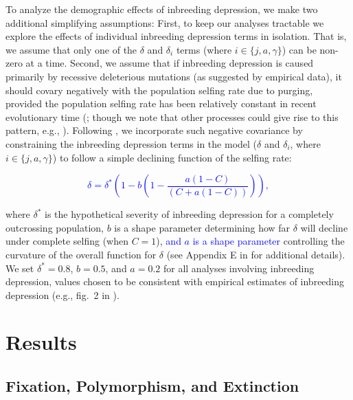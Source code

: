 \documentclass[11pt]{article}
\begin{document}
To analyze the demographic effects of inbreeding depression, we make two additional simplifying assumptions: First, to keep our analyses tractable we explore the effects of individual inbreeding depression terms in isolation. That is, we assume that only one of the $\delta$ and $\delta_i$ terms (where $i \in \{j,a,\gamma\}$) can be non-zero at a time. Second, we assume that if inbreeding depression is caused primarily by recessive deleterious mutations (as suggested by empirical data), it should covary negatively with the population selfing rate due to purging, provided the population selfing rate has been relatively constant in recent evolutionary time (\citealt{Charlesworth2009}; though we note that other processes could give rise to this pattern, e.g., \citealt{CrnokrakBarrett2002, Charlesworth2009,HedrickGarcia-Dorado2016}). Following \citet{Olito2019}, we incorporate such negative covariance by constraining the inbreeding depression terms in the model ($\delta$ and $\delta_i$, where $i \in \{j,a,\gamma\}$) to follow a simple declining function of the selfing rate: 
\begin{linenomath*}
\textcolor{blue}{
\begin{equation}
  \delta = \delta^{\ast} \left(1 - b \left(1 - \frac{a(1 - C)}{(C + a(1 - C))}\right)\right),
  \label{eq:Canddelta}
\end{equation}}
\end{linenomath*}
where $\delta^{\ast}$ is the hypothetical severity of inbreeding depression for a completely outcrossing population, $b$ is a shape parameter determining how far $\delta$ will decline under complete selfing (when $C = 1$), \textcolor{blue}{and $a$ is a shape parameter} controlling the curvature of the overall function for $\delta$ (see Appendix E in \citealt{Olito2019} for additional details). We set $\delta^{\ast} = 0.8$, $b = 0.5$, and $a = 0.2$ for all analyses involving inbreeding depression, values chosen to be consistent with empirical estimates of inbreeding depression (e.g., fig.~2 in \citealt{HusbandSchemske1996}). 





\section*{Results}\label{sec:Results}

\subsection*{Fixation, Polymorphism, and Extinction}\label{subsec:PolyExt}
\end{document}
